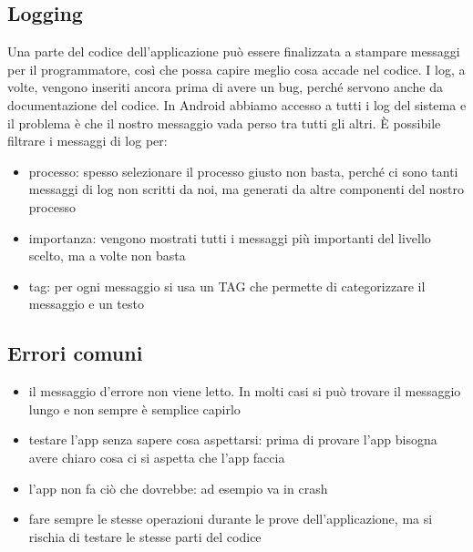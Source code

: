 \subsection{Logging}
Una parte del codice dell'applicazione può essere finalizzata a stampare messaggi per il programmatore, così che possa capire meglio cosa accade nel codice. I log, a volte, vengono inseriti ancora prima di avere un bug, perché servono anche da documentazione del codice.
In Android abbiamo accesso a tutti i log del sistema e il problema è che il nostro messaggio vada perso tra tutti gli altri. 
È possibile filtrare i messaggi di log per:
\begin{itemize}
    \item processo: spesso selezionare il processo giusto non basta, perché ci sono tanti messaggi di log non scritti da noi, ma generati da altre componenti del nostro processo
    \item importanza: vengono mostrati tutti i messaggi più importanti del livello scelto, ma a volte non basta
    \item tag: per ogni messaggio si usa un TAG che permette di categorizzare il messaggio e un testo
\end{itemize}

\subsection{Errori comuni}
\begin{itemize}
    \item il messaggio d'errore non viene letto. In molti casi si può trovare il messaggio lungo e non sempre è semplice capirlo
    \item testare l'app senza sapere cosa aspettarsi: prima di provare l'app bisogna avere chiaro cosa ci si aspetta che l'app faccia
    \item l'app non fa ciò che dovrebbe: ad esempio va in crash
    \item fare sempre le stesse operazioni durante le prove dell'applicazione, ma si rischia di testare le stesse parti del codice
\end{itemize} 

